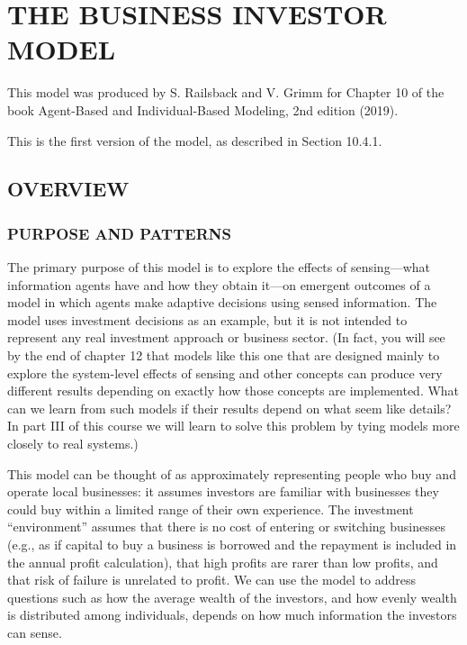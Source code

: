 \documentclass[]{article}
\title{}
\author{}
\date{}
\begin{document}
\hypertarget{the-business-investor-model}{%
\section{THE BUSINESS INVESTOR
MODEL}\label{the-business-investor-model}}

This model was produced by S. Railsback and V. Grimm for Chapter 10 of
the book Agent-Based and Individual-Based Modeling, 2nd edition (2019).

This is the first version of the model, as described in Section 10.4.1.

\hypertarget{overview}{%
\subsection{OVERVIEW}\label{overview}}

\hypertarget{purpose-and-patterns}{%
\subsubsection{PURPOSE AND PATTERNS}\label{purpose-and-patterns}}

The primary purpose of this model is to explore the effects of
sensing---what information agents have and how they obtain it---on
emergent outcomes of a model in which agents make adaptive decisions
using sensed information. The model uses investment decisions as an
example, but it is not intended to represent any real investment
approach or business sector. (In fact, you will see by the end of
chapter 12 that models like this one that are designed mainly to explore
the system-level effects of sensing and other concepts can produce very
different results depending on exactly how those concepts are
implemented. What can we learn from such models if their results depend
on what seem like details? In part III of this course we will learn to
solve this problem by tying models more closely to real systems.)

This model can be thought of as approximately representing people who
buy and operate local businesses: it assumes investors are familiar with
businesses they could buy within a limited range of their own
experience. The investment ``environment'' assumes that there is no cost
of entering or switching businesses (e.g., as if capital to buy a
business is borrowed and the repayment is included in the annual profit
calculation), that high profits are rarer than low profits, and that
risk of failure is unrelated to profit. We can use the model to address
questions such as how the average wealth of the investors, and how
evenly wealth is distributed among individuals, depends on how much
information the investors can sense.
\end{document}
